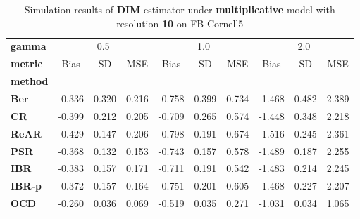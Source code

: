 \begin{table}
\centering
\caption{Simulation results of \textbf{DIM} estimator under \textbf{multiplicative} model with resolution \textbf{10} on FB-Cornell5}
\begin{tabular}{lccccccccc}
\toprule
\textbf{gamma} & \multicolumn{3}{c}{0.5} & \multicolumn{3}{c}{1.0} & \multicolumn{3}{c}{2.0} \\
\textbf{metric} &   Bias &     SD &    MSE &   Bias &     SD &    MSE &   Bias &     SD &    MSE \\
\textbf{method} &        &        &        &        &        &        &        &        &        \\
\midrule
\textbf{Ber} & -0.336 &  0.320 &  0.216 & -0.758 &  0.399 &  0.734 & -1.468 &  0.482 &  2.389 \\
\textbf{CR} & -0.399 &  0.212 &  0.205 & -0.709 &  0.265 &  0.574 & -1.448 &  0.348 &  2.218 \\
\textbf{ReAR} & -0.429 &  0.147 &  0.206 & -0.798 &  0.191 &  0.674 & -1.516 &  0.245 &  2.361 \\
\textbf{PSR} & -0.368 &  0.132 &  0.153 & -0.743 &  0.157 &  0.578 & -1.489 &  0.187 &  2.255 \\
\textbf{IBR} & -0.383 &  0.157 &  0.171 & -0.711 &  0.191 &  0.542 & -1.483 &  0.214 &  2.245 \\
\textbf{IBR-p} & -0.372 &  0.157 &  0.164 & -0.751 &  0.201 &  0.605 & -1.468 &  0.227 &  2.207 \\
\textbf{OCD} & -0.260 &  0.036 &  0.069 & -0.519 &  0.035 &  0.271 & -1.031 &  0.034 &  1.065 \\
\bottomrule
\end{tabular}
\end{table}
